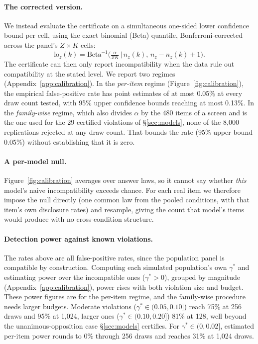 \paragraph{The corrected version.} We instead evaluate the certificate on a
simultaneous one-sided lower confidence bound per cell, using the exact
binomial (Beta) quantile, Bonferroni-corrected across the panel's
$Z\times K$ cells:
\[
\mathrm{lo}_z(k) = \mathrm{Beta}^{-1}\big(\tfrac{\alpha}{ZK} \,\big|\, n_z(k),\, n_z - n_z(k) + 1\big).
\] The certificate
can then only report incompatibility when the data rule out compatibility at
the stated level. We report two regimes (Appendix~\ref{app:calibration}). In the
\emph{per-item} regime (Figure~\ref{fig:calibration}), the empirical
false-positive rate has point estimates of at most 0.05\% at every draw count
tested, with 95\% upper confidence bounds reaching at most 0.13\%. In the
\emph{family-wise} regime, which also divides $\alpha$ by the 480 items of a
screen and is the one used for the 29 certified violations of
\S\ref{sec:models}, none of the 8{,}000 replications rejected at any draw
count. That bounds the rate (95\% upper bound 0.05\%) without establishing that
it is zero.

\paragraph{A per-model null.} Figure~\ref{fig:calibration} averages over answer
laws, so it cannot say whether \emph{this} model's naive incompatibility exceeds
chance. For each real item we therefore impose the null directly (one common
law from the pooled conditions, with that item's own disclosure rates) and
resample, giving the count that model's items would produce with no
cross-condition structure.

\paragraph{Detection power against known violations.} The rates above are all
false-positive rates, since the population panel is compatible by
construction. Computing each simulated population's own $\gamma^*$ and
estimating power over the incompatible ones ($\gamma^*>0$), grouped by
magnitude (Appendix~\ref{app:calibration}), power rises with both violation
size and budget. These power figures are for the per-item regime, and the
family-wise procedure needs larger budgets. Moderate violations
($\gamma^*\in(0.05,0.10]$) reach 75\% at 256 draws and 95\% at 1{,}024, larger
ones ($\gamma^*\in(0.10,0.20]$) 81\% at 128, well beyond the
unanimous-opposition case \S\ref{sec:models} certifies. For
$\gamma^*\in(0,0.02]$, estimated per-item power rounds to 0\% through 256 draws
and reaches 31\% at 1{,}024 draws.
